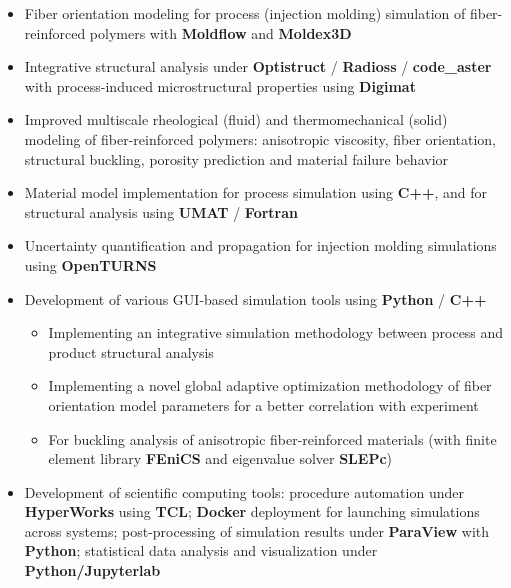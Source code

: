 \documentclass[10pt,a4paper]{altacv}
\begin{document}
\begin{itemize}
\item Fiber orientation modeling for process (injection molding) simulation of fiber-reinforced polymers with \textbf{Moldflow} and \textbf{Moldex3D}
\item Integrative structural analysis under \textbf{Optistruct} / \textbf{Radioss} / \textbf{code\_aster} with process-induced microstructural properties using \textbf{Digimat}
\item Improved multiscale rheological (fluid) and thermomechanical (solid) modeling of fiber-reinforced polymers: anisotropic viscosity, fiber orientation, structural buckling, porosity prediction and material failure behavior
\item Material model implementation for process simulation using \textbf{C++}, and for structural analysis using \textbf{UMAT} / \textbf{Fortran}
\item Uncertainty quantification and propagation for injection molding simulations using \textbf{OpenTURNS}
\item Development of various GUI-based simulation tools using \textbf{Python} / \textbf{C++}
  \begin{itemize}
    \item Implementing an integrative simulation methodology between process and product structural analysis
    \item Implementing a novel global adaptive optimization methodology of fiber orientation model parameters for a better correlation with experiment
    \item For buckling analysis of anisotropic fiber-reinforced materials (with finite element library \textbf{FEniCS} and eigenvalue solver \textbf{SLEPc})
  \end{itemize}
\item Development of scientific computing tools: procedure automation under \textbf{HyperWorks} using \textbf{TCL}; \textbf{Docker} deployment for launching simulations across systems; post-processing of simulation results under \textbf{ParaView} with \textbf{Python}; statistical data analysis and visualization under \textbf{Python/Jupyterlab}
\end{itemize}
\end{document}
